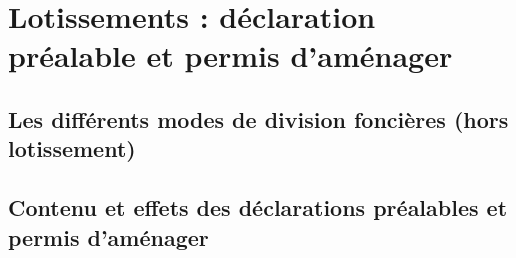 \chapter[Lotissements]{Lotissements : déclaration préalable et permis d'aménager}


\section{Les différents modes de division foncières (hors lotissement)}


\section{Contenu et effets des déclarations préalables et permis d'aménager}
	
	